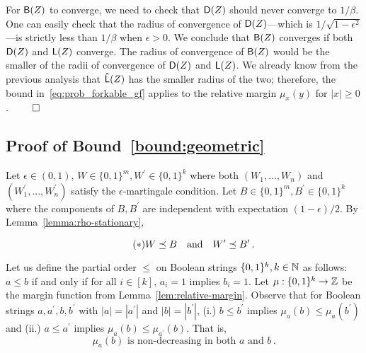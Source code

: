   For $\mathsf{B}(Z)$ to converge, we need to check that $\mathsf{D}(Z)$
  should never converge to $1/\beta$.  One can easily check that
  the radius of convergence of $\mathsf{D}(Z)$---which is
  $\displaystyle 1/\sqrt{1-\epsilon^2}$---is strictly less than $1/\beta$ when
  $\epsilon > 0$.  We conclude that $\mathsf{B}(Z)$ converges if
  both $\mathsf{D}(Z)$ and $\mathsf{L}(Z)$ converge.  The radius of
  convergence of $\mathsf{B}(Z)$ would be the smaller of the radii
  of convergence of $\mathsf{D}(Z)$ and $\mathsf{L}(Z)$.  We already
  know from the previous analysis that $\mathsf{\hat{L}}(Z)$ has the
  smaller radius of the two; therefore, the bound
  in~\eqref{eq:prob_forkable_gf} applies to the relative margin $\mu_x(y)$
  for $|x|\geq 0$. 
  \hfill $\qed$  


\subsection{Proof of Bound~\ref{bound:geometric}}\label{sec:martingale-proof-new}

Let $\epsilon \in (0, 1)$,  
$W \in \{0,1\}^m, W^\prime \in \{0,1\}^k$ 
where both $(W_1, \ldots, W_n)$ and $(W^\prime_1, \ldots, W^\prime_n)$ 
satisfy the $\epsilon$-martingale condition. 
Let $B \in \{0,1\}^m, B^\prime \in \{0,1\}^k$ where the components of $B, B^\prime$ 
are independent with expectation $(1 - \epsilon)/2$.
By Lemma~\ref{lemma:rho-stationary}, 

\begin{equation*}\label{eq:WB-dominance}\tag{$*$}
  W \preceq B\quad \text{and} \quad W^\prime \preceq B^\prime
  \,. 
\end{equation*}

Let us define the partial order $\leq$ on Boolean strings $\{0,1\}^k, k \in \mathbb{N}$ 
as follows: 
$a \leq b$ if and only if
for all $i \in [k]$, $a_i = 1$ implies $b_i = 1$. 
Let $\mu : \{0,1\}^k \rightarrow \mathbb{Z}$ be the margin function 
from Lemma~\ref{lem:relative-margin}. 
Observe that for Boolean strings $a, a^\prime, b, b^\prime$ 
with $|a| = |a^\prime|$ and $|b| = |b^\prime|$, 
(i.) $b \leq b^\prime$ implies $\mu_a(b) \leq \mu_a(b^\prime)$ and 
(ii.) $a \leq a^\prime$ implies $\mu_a(b) \leq \mu_{a^\prime}(b)$. 
That is, 
\begin{equation*}\label{eq:mu-WB-dominance}\tag{$\dagger$}
  \text{$\mu_a(b)$ is non-decreasing in both $a$ and $b$}
  \,.   
\end{equation*}

